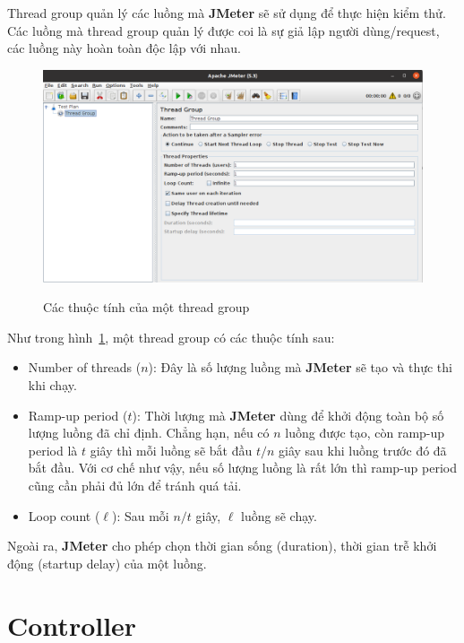 \documentclass[10pt]{report}
\newcommand{\jmeter}{\textbf{JMeter}}
\begin{document}
\par Thread group quản lý các luồng mà \jmeter{} sẽ sử dụng để thực hiện kiểm thử. Các luồng mà thread group quản lý được coi là sự giả lập người dùng/request, các luồng này hoàn toàn độc lập với nhau.

\FloatBarrier{}
\begin{figure}[htp]
    \centering
    \includegraphics[scale=0.3]{thread-group.png}
    \caption{Các thuộc tính của một thread group}
    {\label{fig:thread-group}}
\end{figure}
\FloatBarrier{}

\par Như trong hình~\ref{fig:thread-group}, một thread group có các thuộc tính sau:
\begin{itemize}
    \item Number of threads ($n$): Đây là số lượng luồng mà \jmeter{} sẽ tạo và thực thi khi chạy.
    \item Ramp-up period ($t$): Thời lượng mà \jmeter{} dùng để khởi động toàn bộ số lượng luồng đã chỉ định. Chẳng hạn, nếu có $n$ luồng được tạo, còn ramp-up period là $t$ giây thì mỗi luồng sẽ bắt đầu $t/n$ giây sau khi luồng trước đó đã bắt đầu. Với cơ chế như vậy, nếu số lượng luồng là rất lớn thì ramp-up period cũng cần phải đủ lớn để tránh quá tải.
    \item Loop count ($\ell$): Sau mỗi $n/t$ giây, $\ell$ luồng sẽ chạy.
\end{itemize}

\par Ngoài ra, \jmeter{} cho phép chọn thời gian sống (duration), thời gian trễ khởi động (startup delay) của một luồng.

\section{Controller}
\end{document}
